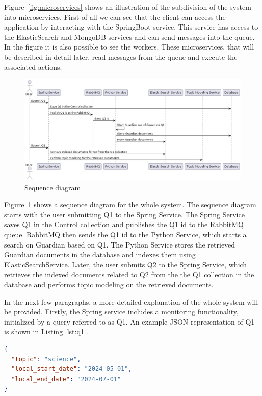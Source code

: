 Figure~\ref{fig:microservices} shows an illustration of the subdivision of
the system into microservices. First of all we can see that the client can
access the application by interacting with the SpringBoot service.
This service has access to the ElasticSearch and MongoDB services and can
send messages into the queue. In the figure it is also possible to see
the workers. These microservices, that will be described in detail
later, read messages from the queue and execute the associated actions.

\clearpage

\begin{figure}[ht]
    \centering
    \includegraphics[width=0.7\linewidth]{figures/sequenceDiagram.png}
    \caption{Sequence diagram}
    \label{fig:seqDiagram}
\end{figure}

Figure~\ref{fig:seqDiagram} shows a sequence diagram for the whole system.
The sequence diagram starts with the user submitting Q1 to the Spring Service. The
Spring Service saves Q1 in the Control collection and publishes the Q1 id to the
RabbitMQ queue. RabbitMQ then sends the Q1 id to the Python Service, which starts a
search on Guardian based on Q1. The Python Service stores the retrieved Guardian
documents in the database and indexes them using ElasticSearchService. Later, the user
submits Q2 to the Spring Service, which retrieves the indexed documents related to Q2
from the the Q1 collection in the database and performs topic modeling on the retrieved
documents.

In the next few paragraphs, a more detailed explanation of the whole system will be provided.
Firstly, the Spring service includes a monitoring functionality, initialized by a query referred to as Q1. An
example JSON representation of Q1 is shown in Listing \ref{lst:q1}.

\begin{lstlisting}[language=json, caption={JSON representation of Q1}, label={lst:q1}]
{
  "topic": "science",
  "local_start_date": "2024-05-01",
  "local_end_date": "2024-07-01"
}
\end{lstlisting}

